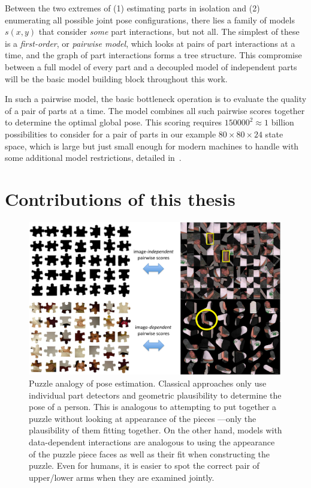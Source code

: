 Between the two extremes of (1) estimating parts in isolation and (2) 
enumerating all possible joint pose configurations, there lies a family of 
models $s(x,y)$ that consider {\em some} part interactions, but not all.  The 
simplest of these is a {\em first-order}, or {\em pairwise model}, which looks 
at pairs of part interactions at a time, and the graph of part interactions 
forms a tree structure.  This compromise between a full model of every part and 
a decoupled model of independent parts will be the basic model building block 
throughout this work.

In such a pairwise model, the basic bottleneck operation is to evaluate the 
quality of a pair of parts at a time. The model combines all such pairwise 
scores together to determine the optimal global pose.  This scoring requires 
$150000^2 \approx 1$ billion possibilities to consider for a pair of parts in 
our example $80 \times 80 \times 24$ state space, which is large but just small 
enough for modern machines to handle with some additional model restrictions, 
detailed in~.


\section{Contributions of this thesis}
\begin{figure}[t!]
\begin{center}
\includegraphics[width=0.99\textwidth]{figs/puzzle.pdf}
\caption[Puzzle analogy of pose estimation.]{Puzzle analogy of pose estimation.  
Classical approaches only use individual part detectors and geometric 
plausibility to determine the pose of a person.  This is analogous to 
attempting to put together a puzzle without looking at appearance of the pieces 
---only the plausibility of them fitting together. On the other hand, models 
with data-dependent interactions are analogous to using the appearance of the 
puzzle piece faces as well as their fit when constructing the puzzle.  Even for 
humans, it is easier to spot the correct pair of upper/lower arms when they are 
examined jointly.}
\label{fig:puzzle}
\end{center}
\end{figure}

